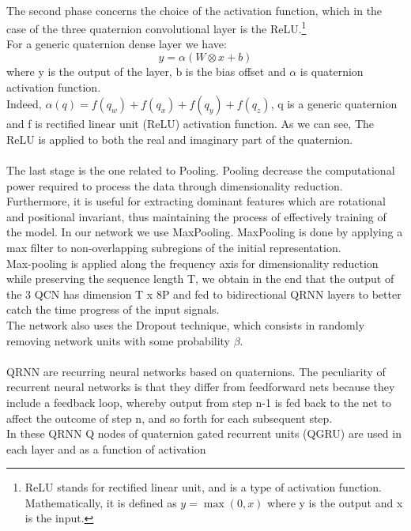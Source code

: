 \documentclass{article}
\begin{document}
    \\ The second phase concerns the choice of the activation function, which in the case of the three quaternion convolutional layer 
    is the ReLU.\footnote{ReLU stands for rectified linear unit, and is a type of activation function. Mathematically, it is defined 
    as $y = \max(0, x)$ where y is the output and x is the input.}
    \\ For a generic quaternion dense layer we have:
    \begin{equation*}
        y = \alpha( W \otimes x + b)
    \end{equation*}
    where  y is the output of the layer, b is the bias offset and $\alpha$ is quaternion activation function.
    \\ Indeed,  $\alpha(q) = f(q_w) + f(q_x) + f(q_y) + f(q_z)$, q is a generic quaternion and f is rectified linear unit (ReLU) 
    activation function. As we can see, The ReLU is applied to both the real and imaginary part of the quaternion.
    \\ \\ The last stage is the one related to Pooling. Pooling decrease the computational power required to process the data through 
    dimensionality reduction. Furthermore, it is useful for extracting dominant features which are rotational and positional invariant,
    thus maintaining the process of effectively training of the model. In our network we use MaxPooling.
    MaxPooling is done by applying a max filter to non-overlapping subregions of the initial representation.
    \\ Max-pooling is applied along the frequency axis for 
    dimensionality reduction while preserving the sequence length T, we obtain in the end that the output of the 3 QCN has 
    dimension T x 8P and fed to bidirectional QRNN layers to better catch the time progress of the input signals.  
    \\ The network also uses the Dropout technique, which consists in randomly removing network units with some probability $\beta$.
    \\ \\ QRNN are recurring neural networks based on quaternions.
    The peculiarity of recurrent neural networks is that they differ from feedforward nets because they include a feedback loop,
    whereby output from step n-1 is fed back to the net to affect the outcome of step n, and so forth for each subsequent step.
    \\ In these QRNN Q nodes of quaternion gated recurrent units (QGRU) are used in each layer and as a function of activation
\end{document}
